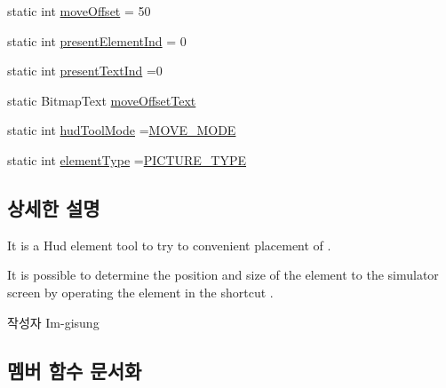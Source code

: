 \begin{DoxyCompactItemize}
\item 
static int \hyperlink{classkr_1_1ac_1_1kookmin_1_1cs_1_1tool_1_1_hud_layout_tool_a9207f2feb57881dd1d60896e45408aa5}{move\+Offset} = 50
\item 
static int \hyperlink{classkr_1_1ac_1_1kookmin_1_1cs_1_1tool_1_1_hud_layout_tool_a1611225d44b7a53cd3a3dcf3dc85b784}{present\+Element\+Ind} = 0
\item 
static int \hyperlink{classkr_1_1ac_1_1kookmin_1_1cs_1_1tool_1_1_hud_layout_tool_ae849face952e72f68da8d09981c71c43}{present\+Text\+Ind} =0
\item 
static Bitmap\+Text \hyperlink{classkr_1_1ac_1_1kookmin_1_1cs_1_1tool_1_1_hud_layout_tool_a614db3c37174dc2724e9a30de2d6a891}{move\+Offset\+Text}
\item 
static int \hyperlink{classkr_1_1ac_1_1kookmin_1_1cs_1_1tool_1_1_hud_layout_tool_a6fb0515ee80d878c5fd737b9586772b6}{hud\+Tool\+Mode} =\hyperlink{classkr_1_1ac_1_1kookmin_1_1cs_1_1tool_1_1_hud_layout_tool_aecec03baf905df4aaef15cd37abe3abd}{M\+O\+V\+E\+\_\+\+M\+O\+D\+E}
\item 
static int \hyperlink{classkr_1_1ac_1_1kookmin_1_1cs_1_1tool_1_1_hud_layout_tool_a15ae154367e2b7529894488ef358f004}{element\+Type} =\hyperlink{classkr_1_1ac_1_1kookmin_1_1cs_1_1tool_1_1_hud_layout_tool_a58687211a1e83d17321e0ee8fc77bd6f}{P\+I\+C\+T\+U\+R\+E\+\_\+\+T\+Y\+P\+E}
\end{DoxyCompactItemize}


\subsection{상세한 설명}
It is a Hud element tool to try to convenient placement of . 

It is possible to determine the position and size of the element to the simulator screen by operating the element in the shortcut . \begin{DoxyAuthor}{작성자}
Im-\/gisung 
\end{DoxyAuthor}


\subsection{멤버 함수 문서화}
\hypertarget{classkr_1_1ac_1_1kookmin_1_1cs_1_1tool_1_1_hud_layout_tool_a2105ce4edf93ec4dea92c388b98f7941}{}
